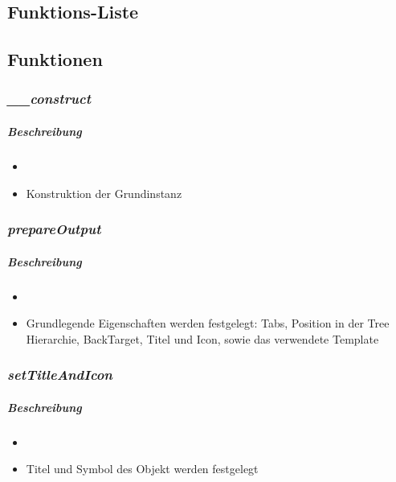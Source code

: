 \subsection*{Funktions-Liste}
\subparagraph{}
\subparagraph{}
\subparagraph{}
\subparagraph{}
\subparagraph{}
\subparagraph{}
\subparagraph{}
\subparagraph{}
\subparagraph{}
\subparagraph{}
\subparagraph{}
\subparagraph{}


\subsection*{Funktionen}

\subsubsection*{\textit{\_\_construct}}\label{constructGGUI}
\subparagraph{Beschreibung}
\begin{itemize}
	\item[] \noindent{}
	\item[] Konstruktion der Grundinstanz
\end{itemize}

\subsubsection*{\textit{prepareOutput}}\label{prepareOutputGGUI}
\subparagraph{Beschreibung}
\begin{itemize}
	\item[] \noindent{}
	\item[] Grundlegende Eigenschaften werden festgelegt: Tabs, Position in der Tree Hierarchie, BackTarget, Titel und Icon, sowie das verwendete Template
\end{itemize}

\subsubsection*{\textit{setTitleAndIcon}}\label{setTitleAndIconGGUI}
\subparagraph{Beschreibung}
\begin{itemize}
	\item[] \noindent{}
	\item[] Titel und Symbol des Objekt werden festgelegt
\end{itemize}

